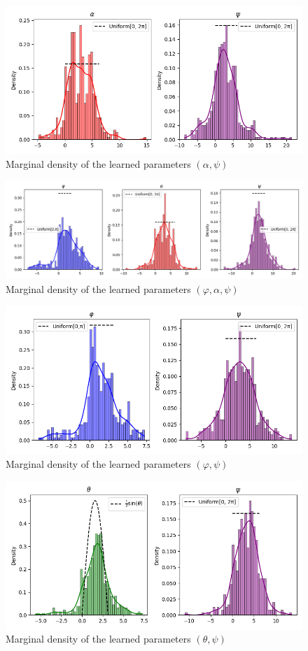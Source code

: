 \documentclass[a4paper,12pt]{article}
\theoremstyle{definition}
\begin{document}
\begin{figure}[H]
    \centering
    \includegraphics[height=0.35\textwidth]{VariableSelectionPsi/alpha_psi.png}
    \caption{Marginal density of the learned parameters \((\alpha,\psi)\)}
    \label{fig:Distributions5.1}
\end{figure}
\begin{figure}[H]
    \centering
    \includegraphics[height=0.35\textwidth]{VariableSelectionPsi/phi_alpha_psi.png}
    \caption{Marginal density of the learned parameters \((\varphi,\alpha,\psi)\)}
    \label{fig:Distributions5.2}
\end{figure}
\begin{figure}[H]
    \centering
    \includegraphics[height=0.35\textwidth]{VariableSelectionPsi/phi_psi.png}
    \caption{Marginal density of the learned parameters \((\varphi,\psi)\)}
    \label{fig:Distributions5.3}
\end{figure}
\begin{figure}[H]
    \centering
    \includegraphics[height=0.35\textwidth]{VariableSelectionPsi/theta_psi.png}
    \caption{Marginal density of the learned parameters \((\theta,\psi)\)}
    \label{fig:Distributions5.4}
\end{figure}
\end{document}
